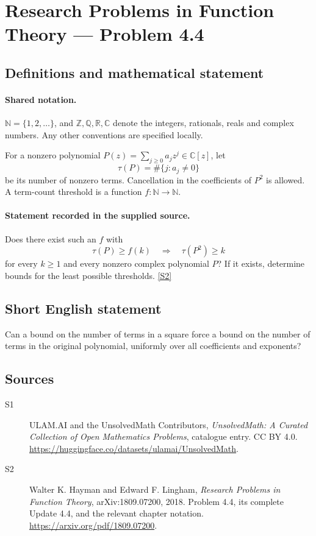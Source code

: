 \documentclass[11pt]{book}
\newcommand{\sref}[2]{\hyperlink{source:#1:#2}{[S#2]}}
\begin{document}
\section{Research Problems in Function Theory — Problem 4.4}\label{statement}

\subsection{Definitions and mathematical statement}

\paragraph{Shared notation.}$\mathbb N=\{1,2,\ldots\}$, and $\mathbb Z,\mathbb Q,\mathbb R,\mathbb C$ denote the integers, rationals, reals and complex numbers. Any other conventions are specified locally.


For a nonzero polynomial $P(z)=\sum_{j\ge0}a_jz^j\in\mathbb C[z]$, let
\[\tau(P)=\#\{j:a_j\ne0\}\]
be its number of nonzero terms. Cancellation in the coefficients of $P^2$ is allowed. A term-count threshold is a function $f:\mathbb N\to\mathbb N$.
\paragraph{Statement recorded in the supplied source.}
Does there exist such an $f$ with
\[\tau(P)\ge f(k)\quad\Longrightarrow\quad\tau(P^2)\ge k
\]
for every $k\ge1$ and every nonzero complex polynomial $P$? If it exists, determine bounds for the least possible thresholds. \sref{statement}{2}
\subsection{Short English statement}
Can a bound on the number of terms in a square force a bound on the number of terms in the original polynomial, uniformly over all coefficients and exponents?
\subsection{Sources}
\begin{description}
\item[\hypertarget{source:statement:1}{S1}] ULAM.AI and the UnsolvedMath Contributors, \emph{UnsolvedMath: A Curated Collection of Open Mathematics Problems}, catalogue entry. CC BY 4.0. \url{https://huggingface.co/datasets/ulamai/UnsolvedMath}.
\item[\hypertarget{source:statement:2}{S2}] Walter K. Hayman and Edward F. Lingham, \emph{Research Problems in Function Theory}, arXiv:1809.07200, 2018. Problem 4.4, its complete Update 4.4, and the relevant chapter notation. \url{https://arxiv.org/pdf/1809.07200}.
\end{description}
\label{end:statement}
\end{document}
